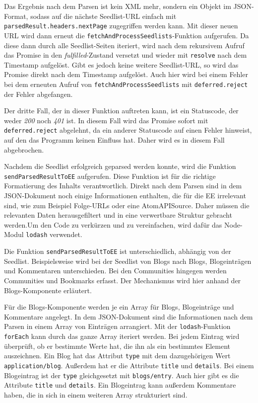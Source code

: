 Das Ergebnis nach dem Parsen ist kein \ac{XML} mehr, sondern ein Objekt im \acs{JSON}-Format, sodass auf die nächste Seedlist-\ac{URL} einfach mit \texttt{parsedResult.headers.nextPage} zugegriffen werden kann. Mit dieser neuen \ac{URL} wird dann erneut die \texttt{fetchAndProcessSeedlists}-Funktion aufgerufen. Da diese dann durch alle Seedlist-Seiten iteriert, wird nach dem rekursivem Aufruf das Promise in den \textit{fulfilled}-Zustand versetzt und wieder mit \texttt{resolve} nach dem Timestamp aufgelöst. Gibt es jedoch keine weitere Seedlist-\ac{URL}, so wird das Promise direkt nach dem Timestamp aufgelöst. Auch hier wird bei einem Fehler bei dem erneuten Aufruf von \texttt{fetchAndProcessSeedlists} mit \texttt{deferred.reject} der Fehler abgefangen.

Der dritte Fall, der in dieser Funktion auftreten kann, ist ein Statuscode, der weder \textit{200} noch \textit{401} ist. In diesem Fall wird das Promise sofort mit \texttt{deferred.reject} abgelehnt, da ein anderer Statuscode auf einen Fehler hinweist, auf den das Programm keinen Einfluss hat. Daher wird es in diesem Fall abgebrochen.

Nachdem die Seedlist erfolgreich geparsed werden konnte, wird die Funktion \texttt{sendParsedResultToEE} aufgerufen. Diese Funktion ist für die richtige Formatierung des Inhalts verantwortlich. Direkt nach dem Parsen sind in dem \ac{JSON}-Dokument noch einige Informationen enthalten, die für die \acl{EE} irrelevant sind, wie zum Beispiel Folge-\acp{URL} oder eine AtomAPISource. Daher müssen die relevanten Daten herausgefiltert und in eine verwertbare Struktur gebracht werden.Um den Code zu verkürzen und zu vereinfachen, wird dafür das Node-Modul \texttt{lodash} verwendet. 

Die Funktion \texttt{sendParsedResultToEE} ist unterschiedlich, abhängig von der Seedlist. Beispielsweise wird bei der Seedlist von Blogs nach Blogs, Blogeinträgen und Kommentaren unterschieden. Bei den Communities hingegen werden Communities und Bookmarks erfasst. Der Mechanismus wird hier anhand der Blogs-Komponente erläutert.

Für die Blogs-Komponente werden je ein Array für Blogs, Blogeinträge und Kommentare angelegt. In dem \acs{JSON}-Dokument sind die Informationen nach dem Parsen in einem Array von Einträgen arrangiert. Mit der \texttt{lodash}-Funktion \texttt{forEach} kann durch das ganze Array iteriert werden. Bei jedem Eintrag wird überprüft, ob er bestimmte Werte hat, die ihn als ein bestimmtes Element auszeichnen. Ein Blog hat das Attribut \texttt{type} mit dem dazugehörigen Wert \texttt{application/blog}. Außerdem hat er die Attribute \texttt{title} und \texttt{details}. Bei einem Blogeintrag ist der \texttt{type} gleichgesetzt mit \texttt{blogs/entry}. Auch hier gibt es die Attribute \texttt{title} und \texttt{details}. Ein Blogeintrag kann außerdem Kommentare haben, die in sich in einem weiteren Array strukturiert sind. 

